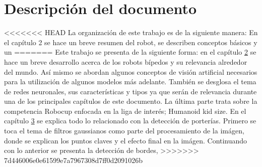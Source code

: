 \section{Descripción del documento}
<<<<<<< HEAD
La organización de este trabajo es de la siguiente manera: En el capítulo 2 se hace un breve resumen del robot, se  describen conceptos básicos y un
=======
Este trabajo se presenta de la siguiente forma: en el capítulo \hyperref[sec:marcoteorico]{2} se hace un breve desarrollo acerca de los robots bípedos y su relevancia alrededor del mundo. Así mismo se abordan algunos conceptos de visión artificial necesarios para la utilización de algunos modelos más adelante. También se desglosa el tema de redes neuronales, sus características y tipos ya que serán de relevancia durante una de los principales capítulos de este documento. La última parte trata sobre la competencia Robocup enfocada en la liga de interés; Humanoid kid size. En el capítulo \hyperref[sec:porteria]{3} se explica todo lo relacionado con la detección de porterías. Primero se toca el tema de filtros gaussianos como parte del procesamiento de la imágen, donde se explican los puntos claves y el efecto final en la imágen. Continuando con lo anterior se presenta la detección de bordes,   
>>>>>>> 7d446006e0e61599e7a7967308d7ff0d2091026b
